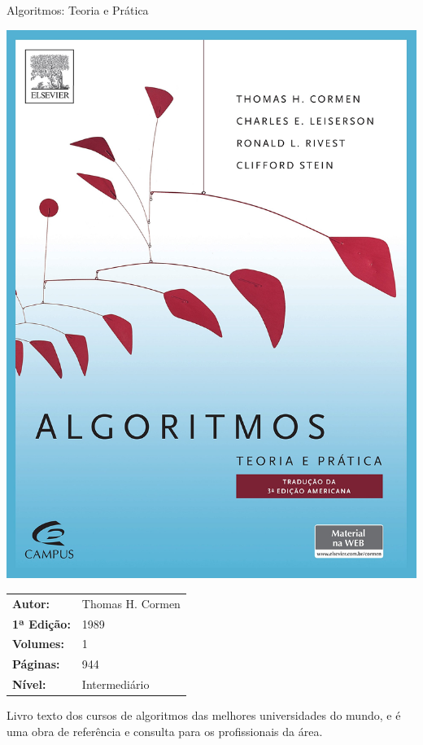 \begin{frame}[fragile]{Algoritmos: Teoria e Prática}

    \begin{minipage}{0.4\textwidth}
        \includegraphics[scale=0.05]{cormen.jpg}
    \end{minipage}
    \begin{minipage}{0.5\textwidth}
        \begin{small}
            \begin{tabularx}{0.98\textwidth}{lX}
                \textbf{Autor:} & Thomas H. Cormen \\
                \textbf{1ª Edição:} & 1989  \\
                \textbf{Volumes:} & 1 \\
                \textbf{Páginas:} & 944 \\
                \textbf{Nível:} & Intermediário \\
            \end{tabularx}
        \end{small}
    \end{minipage}

    \vspace{0.2in} 

    Livro texto dos cursos de algoritmos das melhores universidades do mundo, e é uma obra
    de referência e consulta para os profissionais da área. 

\end{frame}

